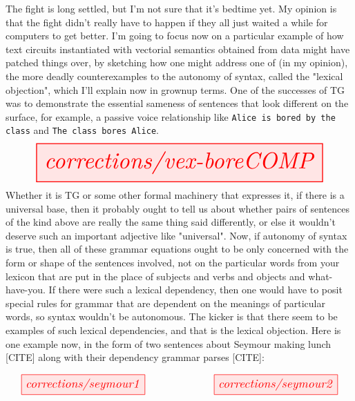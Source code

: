 The fight is long settled, but I'm not sure that it's bedtime yet. My opinion is that the fight didn't really have to happen if they all just waited a while for computers to get better. I'm going to focus now on a particular example of how text circuits instantiated with vectorial semantics obtained from data might have patched things over, by sketching how one might address one of (in my opinion), the more deadly counterexamples to the autonomy of syntax, called the "lexical objection", which I'll explain now in grownup terms. One of the successes of TG was to demonstrate the essential sameness of sentences that look different on the surface, for example, a passive voice relationship like \texttt{Alice is bored by the class} and \texttt{The class bores Alice}. 
\[
\resizebox{\textwidth}{!}{
\tikzfig{corrections/vex-boreCOMP}
}
\]
Whether it is TG or some other formal machinery that expresses it, if there is a universal base, then it probably ought to tell us about whether pairs of sentences of the kind above are really the same thing said differently, or else it wouldn't deserve such an important adjective like "universal". Now, if autonomy of syntax is true, then all of these grammar equations ought to be only concerned with the form or shape of the sentences involved, not on the particular words from your lexicon that are put in the place of subjects and verbs and objects and what-have-you. If there were such a lexical dependency, then one would have to posit special rules for grammar that are dependent on the meanings of particular words, so syntax wouldn't be autonomous. The kicker is that there seem to be examples of such lexical dependencies, and that is the lexical objection. Here is one example now, in the form of two sentences about Seymour making lunch [CITE] along with their dependency grammar parses [CITE]:

\[\resizebox{\textwidth}{!}{\tikzfig{corrections/seymour1} \qquad\qquad \tikzfig{corrections/seymour2}}\]

